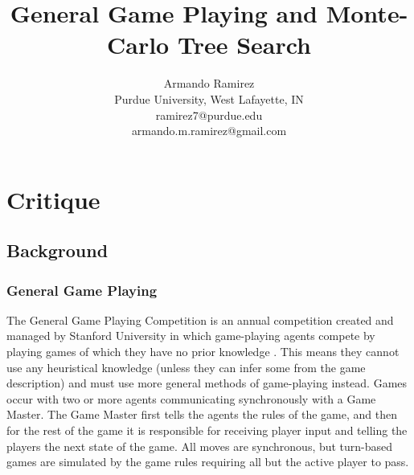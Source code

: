 \documentclass[letterpaper]{article}
\title{General Game Playing and Monte-Carlo Tree Search}
\author{Armando Ramirez \\ Purdue University, West Lafayette, IN \\ ramirez7@purdue.edu \\ armando.m.ramirez@gmail.com}
\begin{document}
\maketitle

\section{Critique}

\subsection{Background}

\subsubsection{General Game Playing}
The General Game Playing Competition is an annual competition created and managed by Stanford University in which game-playing agents compete by playing games of which they have no prior knowledge \cite{StanfordGGP}. This means they cannot use any heuristical knowledge (unless they can infer some from the game description) and must use more general methods of game-playing instead. Games occur with two or more agents communicating synchronously with a Game Master. The Game Master first tells the agents the rules of the game, and then for the rest of the game it is responsible for receiving player input and telling the players the next state of the game. All moves are synchronous, but turn-based games are simulated by the game rules requiring all but the active player to pass.
\end{document}
